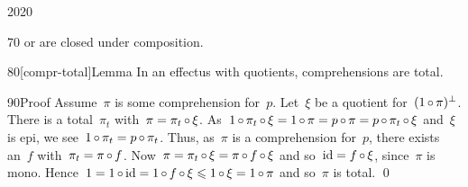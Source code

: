 \begin{parsec}{2020}
\begin{point}{70}
    or are closed under composition.
\end{point}
\begin{point}{80}[compr-total]{Lemma}%
In an effectus with quotients, comprehensions are total.
\begin{point}{90}{Proof}%
Assume~$\pi$ is some comprehension for~$p$.
Let~$\xi$ be a quotient for~$(1 \mathop{\circ} \pi)^\perp$.
There is a total~$\pi_t$ with~$\pi = \pi_t \mathop{\circ} \xi$.
As~$ 1 \mathop{\circ} \pi_t \mathop{\circ} \xi
        = 1 \mathop{\circ} \pi
        = p \mathop{\circ} \pi
        = p \mathop{\circ} \pi_t \mathop{\circ} \xi$
        and~$\xi$ is epi,
        we see~$1 \mathop{\circ} \pi_t = p \mathop{\circ} \pi_t$.
Thus, as~$\pi$ is a comprehension for~$p$,
    there exists an~$f$ with~$\pi_t = \pi \mathop{\circ} f$.
Now~$\pi = \pi_t \mathop{\circ} \xi = \pi \mathop{\circ} f \mathop{\circ} \xi$
    and so~$\operatorname{id} = f \mathop{\circ} \xi$, since~$\pi$ is mono.
Hence~$1 = 1 \mathop{\circ} \operatorname{id} =1 \mathop{\circ} f \mathop{\circ} \xi \leqslant 1 \mathop{\circ} \xi = 1 \mathop{\circ} \pi$
    and so~$\pi$ is total. \qed
\end{point}
\end{point}
\end{parsec}
